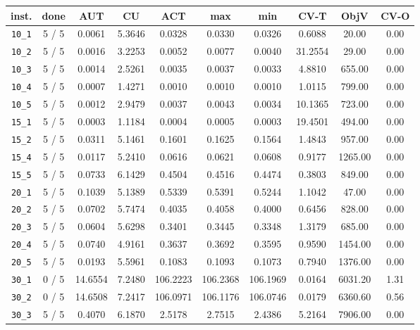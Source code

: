 \begin{table}[h!]
\begin{center}
\small
\begin{tabular}{| c | c | c | c | c | c | c | c | c | c |}
\hline
inst. & done & AUT & CU & ACT & max & min & CV-T & ObjV & CV-O \\
\hline
\verb|10_1| & 5 / 5 & 0.0061 & 5.3646 & 0.0328 & 0.0330 & 0.0326 & 0.6088 & 20.00 & 0.00\\ 
\verb|10_2| & 5 / 5 & 0.0016 & 3.2253 & 0.0052 & 0.0077 & 0.0040 & 31.2554 & 29.00 & 0.00\\ 
\verb|10_3| & 5 / 5 & 0.0014 & 2.5261 & 0.0035 & 0.0037 & 0.0033 & 4.8810 & 655.00 & 0.00\\ 
\verb|10_4| & 5 / 5 & 0.0007 & 1.4271 & 0.0010 & 0.0010 & 0.0010 & 1.0115 & 799.00 & 0.00\\ 
\verb|10_5| & 5 / 5 & 0.0012 & 2.9479 & 0.0037 & 0.0043 & 0.0034 & 10.1365 & 723.00 & 0.00\\ 
\verb|15_1| & 5 / 5 & 0.0003 & 1.1184 & 0.0004 & 0.0005 & 0.0003 & 19.4501 & 494.00 & 0.00\\ 
\verb|15_2| & 5 / 5 & 0.0311 & 5.1461 & 0.1601 & 0.1625 & 0.1564 & 1.4843 & 957.00 & 0.00\\ 
\verb|15_4| & 5 / 5 & 0.0117 & 5.2410 & 0.0616 & 0.0621 & 0.0608 & 0.9177 & 1265.00 & 0.00\\ 
\verb|15_5| & 5 / 5 & 0.0733 & 6.1429 & 0.4504 & 0.4516 & 0.4474 & 0.3803 & 849.00 & 0.00\\ 
\verb|20_1| & 5 / 5 & 0.1039 & 5.1389 & 0.5339 & 0.5391 & 0.5244 & 1.1042 & 47.00 & 0.00\\ 
\verb|20_2| & 5 / 5 & 0.0702 & 5.7474 & 0.4035 & 0.4058 & 0.4000 & 0.6456 & 828.00 & 0.00\\ 
\verb|20_3| & 5 / 5 & 0.0604 & 5.6298 & 0.3401 & 0.3445 & 0.3348 & 1.3179 & 685.00 & 0.00\\ 
\verb|20_4| & 5 / 5 & 0.0740 & 4.9161 & 0.3637 & 0.3692 & 0.3595 & 0.9590 & 1454.00 & 0.00\\ 
\verb|20_5| & 5 / 5 & 0.0193 & 5.5961 & 0.1083 & 0.1093 & 0.1073 & 0.7940 & 1376.00 & 0.00\\ 
\verb|30_1| & 0 / 5 & 14.6554 & 7.2480 & 106.2223 & 106.2368 & 106.1969 & 0.0164 & 6031.20 & 1.31\\ 
\verb|30_2| & 0 / 5 & 14.6508 & 7.2417 & 106.0971 & 106.1176 & 106.0746 & 0.0179 & 6360.60 & 0.56\\ 
\verb|30_3| & 5 / 5 & 0.4070 & 6.1870 & 2.5178 & 2.7515 & 2.4386 & 5.2164 & 7906.00 & 0.00\\ 

\end{tabular}
\end{center}
\end{table}
